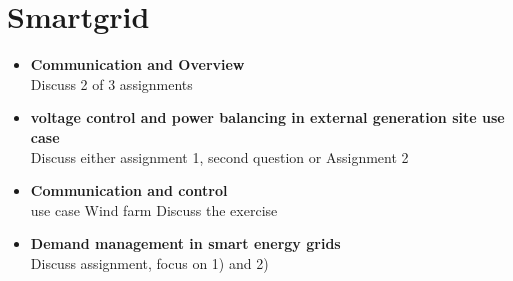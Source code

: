 \chapter{Smartgrid}
\begin{itemize}
        \item \textbf{Communication and Overview}\\
        Discuss 2 of 3 assignments
        \item \textbf{voltage control and power balancing in external generation site use case}\\
        Discuss either assignment 1, second question or
        Assignment 2
        \item \textbf{Communication and control}\\
        use case Wind farm Discuss the exercise
        \item \textbf{Demand management in smart energy grids}\\
        Discuss assignment, focus on 1) and 2)
\end{itemize}